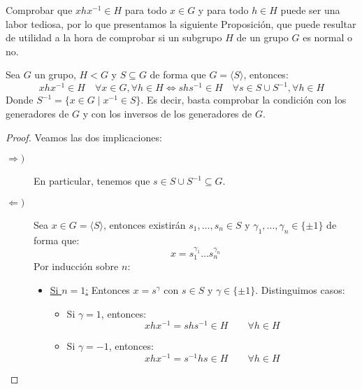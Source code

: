 \noindent
Comprobar que $xhx^{-1}\in H$ para todo $x\in G$ y para todo $h\in H$ puede ser una labor tediosa, por lo que presentamos la siguiente Proposición, que puede resultar de utilidad a la hora de comprobar si un subgrupo $H$ de un grupo $G$ es normal o no.
\begin{prop}
    Sea $G$ un grupo, $H<G$ y $S\subseteq G$ de forma que $G=\langle S \rangle $, entonces:
    \begin{equation*}
        xhx^{-1}\in H \quad \forall x\in G, \forall h\in H \Longleftrightarrow shs^{-1}\in H \quad \forall s\in S\cup S^{-1}, \forall h\in H
    \end{equation*}
    Donde $S^{-1} = \{x\in G \mid x^{-1}\in S\}$. Es decir, basta comprobar la condición con los generadores de $G$ y con los inversos de los generadores de $G$.
    \begin{proof}
        Veamos las dos implicaciones:
        \begin{description}
            \item [$\Longrightarrow)$] En particular, tenemos que $s\in S\cup S^{-1}\subseteq G$.
            \item [$\Longleftarrow)$] Sea $x\in G=\langle S \rangle $, entonces existirán $s_1,\ldots,s_n\in S$ y $\gamma_1,\ldots,\gamma_n \in \{\pm 1\}$ de forma que:
                \begin{equation*}
                    x = s_1^{\gamma_1}\ldots s_n^{\gamma_n}
                \end{equation*}
                Por inducción sobre $n$:
                \begin{itemize}
                    \item \underline{Si $n=1$:} Entonces $x=s^{\gamma}$ con $s\in S$ y $\gamma\in \{\pm 1\}$. Distinguimos casos:
                        \begin{itemize}
                            \item Si $\gamma=1$, entonces:
                                \begin{equation*}
                                    xhx^{-1} = shs^{-1} \in H \qquad \forall h\in H
                                \end{equation*}
                            \item Si $\gamma=-1$, entonces:
                                \begin{equation*}
                                    xhx^{-1} = s^{-1}hs \in H \qquad \forall h\in H
                                \end{equation*}

\end{itemize}
\end{itemize}
\end{description}
\end{proof}
\end{prop}
